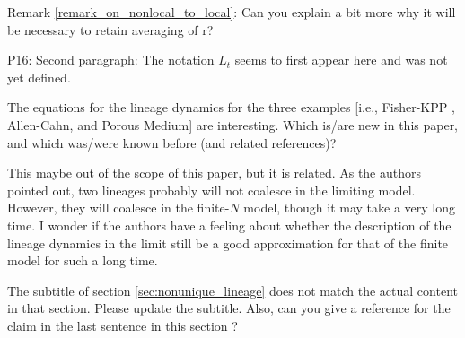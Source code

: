 
\begin{point}{}
Remark \ref{remark_on_nonlocal_to_local}: Can you explain a bit more why it will be necessary to retain averaging of r?
\end{point}


\begin{point}{}
P16: Second paragraph:
The notation $L_t$ seems to first appear here and was not yet defined.
\end{point}


\begin{point}{}
    The equations for the lineage dynamics for the three examples [i.e., Fisher-KPP \revref, Allen-Cahn, and Porous Medium] are interesting.
Which is/are new in this paper, and which was/were known before (and related references)?
\end{point}


\begin{point}{}
This maybe out of the scope of this paper, but it is related. As the authors pointed out, two
lineages probably will not coalesce in the limiting model. However, they will coalesce in
the finite-$N$ model, though it may take a very long time. I wonder if the authors have a
feeling about whether the description of the lineage dynamics in the limit still be a good
approximation for that of the finite model for such a long time.
\end{point}


\begin{point}{}
The subtitle of section \ref{sec:nonunique_lineage} does not match the actual content in that section. Please
update the subtitle. Also, can you give a reference for the claim in the last sentence in this
section \revref?
\end{point}


